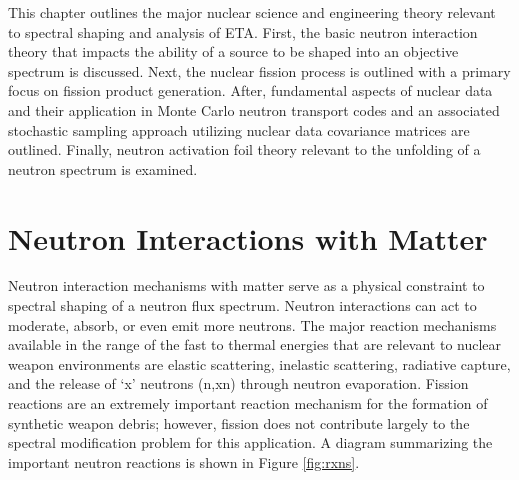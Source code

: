This chapter outlines the major nuclear science and engineering theory relevant to spectral shaping and analysis of ETA. 
First, the basic neutron interaction theory that impacts the ability of a source to be shaped into an objective spectrum is discussed. 
Next, the nuclear fission process is outlined with a primary focus on fission product generation. 
After, fundamental aspects of nuclear data and their application in Monte Carlo neutron transport codes and an associated stochastic sampling approach utilizing nuclear data covariance matrices are outlined.
Finally, neutron activation foil theory relevant to the unfolding of a neutron spectrum is examined. 

\section{Neutron Interactions with Matter}
Neutron interaction mechanisms with matter serve as a physical constraint to spectral shaping of a neutron flux spectrum. 
Neutron interactions can act to moderate, absorb, or even emit more neutrons. 
The major reaction mechanisms available in the range of the fast to thermal energies that are relevant to nuclear weapon environments are elastic scattering, inelastic scattering, radiative capture, and the release of `x' neutrons (n,xn) through neutron evaporation.  
Fission reactions are an extremely important reaction mechanism for the formation of synthetic weapon debris; however, fission does not contribute largely to the spectral modification problem for this application. 
A diagram summarizing the important neutron reactions is shown in Figure \ref{fig:rxns}.

